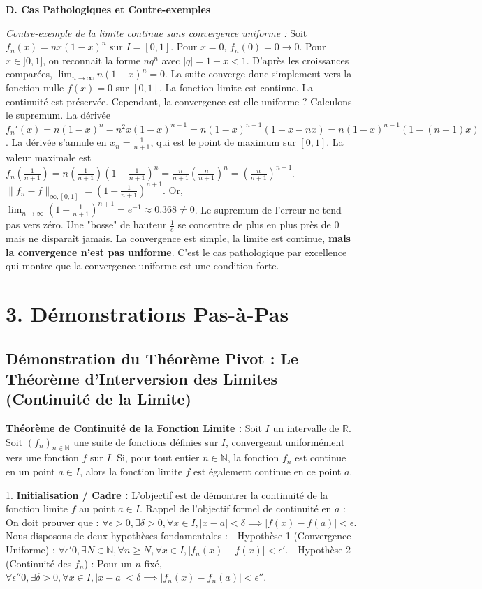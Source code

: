 \documentclass{report}
\begin{document}
\textbf{D. Cas Pathologiques et Contre-exemples}

\textit{Contre-exemple de la limite continue sans convergence uniforme :}
Soit $f_n(x) = nx(1-x)^n$ sur $I = [0, 1]$.
Pour $x=0$, $f_n(0) = 0 \to 0$.
Pour $x \in ]0, 1]$, on reconnait la forme $n q^n$ avec $|q| = 1-x < 1$. D'après les croissances comparées, $\lim_{n \to \infty} n(1-x)^n = 0$.
La suite converge donc simplement vers la fonction nulle $f(x) = 0$ sur $[0, 1]$. La fonction limite est continue. La continuité est préservée.
Cependant, la convergence est-elle uniforme ? Calculons le supremum.
La dérivée $f_n'(x) = n(1-x)^n - n^2x(1-x)^{n-1} = n(1-x)^{n-1}(1 - x - nx) = n(1-x)^{n-1}(1 - (n+1)x)$.
La dérivée s'annule en $x_n = \frac{1}{n+1}$, qui est le point de maximum sur $[0, 1]$.
La valeur maximale est $f_n\left(\frac{1}{n+1}\right) = n \left(\frac{1}{n+1}\right) \left(1 - \frac{1}{n+1}\right)^n = \frac{n}{n+1} \left(\frac{n}{n+1}\right)^n = \left(\frac{n}{n+1}\right)^{n+1}$.
$\|f_n - f\|_{\infty, [0,1]} = \left(1 - \frac{1}{n+1}\right)^{n+1}$.
Or, $\lim_{n \to \infty} \left(1 - \frac{1}{n+1}\right)^{n+1} = e^{-1} \approx 0.368 \neq 0$.
Le supremum de l'erreur ne tend pas vers zéro. Une "bosse" de hauteur $\frac{1}{e}$ se concentre de plus en plus près de 0 mais ne disparaît jamais. La convergence est simple, la limite est continue, \textbf{mais la convergence n'est pas uniforme}. C'est le cas pathologique par excellence qui montre que la convergence uniforme est une condition forte.

\section*{3. Démonstrations Pas-à-Pas}

\subsection*{Démonstration du Théorème Pivot : Le Théorème d'Interversion des Limites (Continuité de la Limite)}

\textbf{Théorème de Continuité de la Fonction Limite :}
Soit $I$ un intervalle de $\mathbb{R}$. Soit $(f_n)_{n \in \mathbb{N}}$ une suite de fonctions définies sur $I$, convergeant uniformément vers une fonction $f$ sur $I$.
Si, pour tout entier $n \in \mathbb{N}$, la fonction $f_n$ est continue en un point $a \in I$, alors la fonction limite $f$ est également continue en ce point $a$.

1. \textbf{Initialisation / Cadre :}
   L'objectif est de démontrer la continuité de la fonction limite $f$ au point $a \in I$.
   Rappel de l'objectif formel de continuité en $a$ :
   On doit prouver que : $\forall \epsilon > 0, \exists \delta > 0, \forall x \in I, |x - a| < \delta \implies |f(x) - f(a)| < \epsilon$.
   Nous disposons de deux hypothèses fondamentales :
   - Hypothèse 1 (Convergence Uniforme) : $\forall \epsilon' 0, \exists N \in \mathbb{N}, \forall n \ge N, \forall x \in I, |f_n(x) - f(x)| < \epsilon'$.
   - Hypothèse 2 (Continuité des $f_n$) : Pour un $n$ fixé, $\forall \epsilon'' 0, \exists \delta > 0, \forall x \in I, |x - a| < \delta \implies |f_n(x) - f_n(a)| < \epsilon''$.
\end{document}
